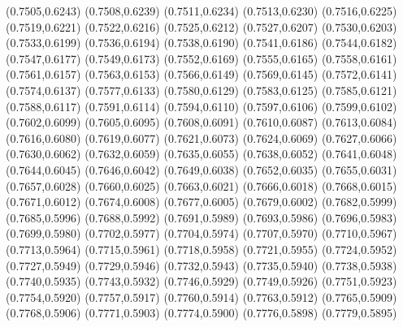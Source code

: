 \PST@Cross(0.7505,0.6243)
\PST@Cross(0.7508,0.6239)
\PST@Cross(0.7511,0.6234)
\PST@Cross(0.7513,0.6230)
\PST@Cross(0.7516,0.6225)
\PST@Cross(0.7519,0.6221)
\PST@Cross(0.7522,0.6216)
\PST@Cross(0.7525,0.6212)
\PST@Cross(0.7527,0.6207)
\PST@Cross(0.7530,0.6203)
\PST@Cross(0.7533,0.6199)
\PST@Cross(0.7536,0.6194)
\PST@Cross(0.7538,0.6190)
\PST@Cross(0.7541,0.6186)
\PST@Cross(0.7544,0.6182)
\PST@Cross(0.7547,0.6177)
\PST@Cross(0.7549,0.6173)
\PST@Cross(0.7552,0.6169)
\PST@Cross(0.7555,0.6165)
\PST@Cross(0.7558,0.6161)
\PST@Cross(0.7561,0.6157)
\PST@Cross(0.7563,0.6153)
\PST@Cross(0.7566,0.6149)
\PST@Cross(0.7569,0.6145)
\PST@Cross(0.7572,0.6141)
\PST@Cross(0.7574,0.6137)
\PST@Cross(0.7577,0.6133)
\PST@Cross(0.7580,0.6129)
\PST@Cross(0.7583,0.6125)
\PST@Cross(0.7585,0.6121)
\PST@Cross(0.7588,0.6117)
\PST@Cross(0.7591,0.6114)
\PST@Cross(0.7594,0.6110)
\PST@Cross(0.7597,0.6106)
\PST@Cross(0.7599,0.6102)
\PST@Cross(0.7602,0.6099)
\PST@Cross(0.7605,0.6095)
\PST@Cross(0.7608,0.6091)
\PST@Cross(0.7610,0.6087)
\PST@Cross(0.7613,0.6084)
\PST@Cross(0.7616,0.6080)
\PST@Cross(0.7619,0.6077)
\PST@Cross(0.7621,0.6073)
\PST@Cross(0.7624,0.6069)
\PST@Cross(0.7627,0.6066)
\PST@Cross(0.7630,0.6062)
\PST@Cross(0.7632,0.6059)
\PST@Cross(0.7635,0.6055)
\PST@Cross(0.7638,0.6052)
\PST@Cross(0.7641,0.6048)
\PST@Cross(0.7644,0.6045)
\PST@Cross(0.7646,0.6042)
\PST@Cross(0.7649,0.6038)
\PST@Cross(0.7652,0.6035)
\PST@Cross(0.7655,0.6031)
\PST@Cross(0.7657,0.6028)
\PST@Cross(0.7660,0.6025)
\PST@Cross(0.7663,0.6021)
\PST@Cross(0.7666,0.6018)
\PST@Cross(0.7668,0.6015)
\PST@Cross(0.7671,0.6012)
\PST@Cross(0.7674,0.6008)
\PST@Cross(0.7677,0.6005)
\PST@Cross(0.7679,0.6002)
\PST@Cross(0.7682,0.5999)
\PST@Cross(0.7685,0.5996)
\PST@Cross(0.7688,0.5992)
\PST@Cross(0.7691,0.5989)
\PST@Cross(0.7693,0.5986)
\PST@Cross(0.7696,0.5983)
\PST@Cross(0.7699,0.5980)
\PST@Cross(0.7702,0.5977)
\PST@Cross(0.7704,0.5974)
\PST@Cross(0.7707,0.5970)
\PST@Cross(0.7710,0.5967)
\PST@Cross(0.7713,0.5964)
\PST@Cross(0.7715,0.5961)
\PST@Cross(0.7718,0.5958)
\PST@Cross(0.7721,0.5955)
\PST@Cross(0.7724,0.5952)
\PST@Cross(0.7727,0.5949)
\PST@Cross(0.7729,0.5946)
\PST@Cross(0.7732,0.5943)
\PST@Cross(0.7735,0.5940)
\PST@Cross(0.7738,0.5938)
\PST@Cross(0.7740,0.5935)
\PST@Cross(0.7743,0.5932)
\PST@Cross(0.7746,0.5929)
\PST@Cross(0.7749,0.5926)
\PST@Cross(0.7751,0.5923)
\PST@Cross(0.7754,0.5920)
\PST@Cross(0.7757,0.5917)
\PST@Cross(0.7760,0.5914)
\PST@Cross(0.7763,0.5912)
\PST@Cross(0.7765,0.5909)
\PST@Cross(0.7768,0.5906)
\PST@Cross(0.7771,0.5903)
\PST@Cross(0.7774,0.5900)
\PST@Cross(0.7776,0.5898)
\PST@Cross(0.7779,0.5895)
